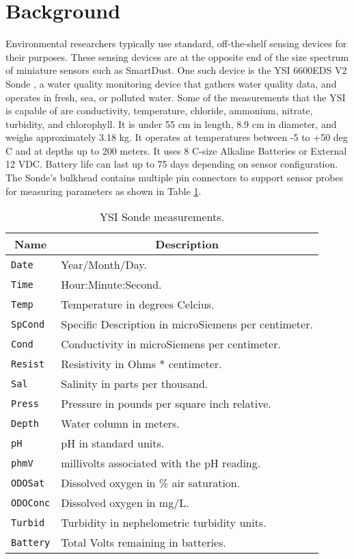 \documentclass[conference]{IEEEtran}
\begin{document}
\section{Background}
\label{SEC_BACKGROUND}

Environmental researchers typically use standard, off-the-shelf
sensing devices for their purposes. These sensing devices are at the
opposite end of the size spectrum of miniature sensors such as SmartDust. One such
device is the YSI 6600EDS V2 Sonde \cite{Sonde01}, a water
quality monitoring device that gathers water quality data, and
operates in fresh, sea, or polluted water. Some of the measurements
that the YSI is capable of are conductivity, temperature, chloride,
ammonium, nitrate, turbidity, and chlorophyll.  It is under 55 cm in
length, 8.9 cm in diameter, and weighs approximately 3.18 kg. It
operates at temperatures between -5 to +50 deg C and at depths up to
200 meters.  It uses 8 C-size Alkaline Batteries or External 12 VDC.
Battery life can last up to 75 days depending on sensor configuration.
The Sonde's bulkhead contains multiple pin connectors to support
sensor probes for measuring parameters as shown in Table
\ref{TAB_SONDE_MEASUREMENTS}.

\begin{table}[h]
\caption{\label{TAB_SONDE_MEASUREMENTS} YSI Sonde measurements.}
\centering
\begin{tabular}{|l||l|}
\hline
\multicolumn{1}{|c||}{\textbf{Name}} &
\multicolumn{1}{c|}{\textbf{Description}} \\ \hline \hline
\texttt{Date}    & Year/Month/Day. \\ \hline
\texttt{Time}    & Hour:Minute:Second. \\ \hline
\texttt{Temp}    & Temperature in degrees Celcius. \\ \hline
\texttt{SpCond}  & Specific Description in microSiemens
                   per centimeter. \\ \hline
\texttt{Cond}    & Conductivity in microSiemens per centimeter. \\ \hline
\texttt{Resist}  & Resistivity in Ohms $*$ centimeter. \\ \hline
\texttt{Sal}     & Salinity in parts per thousand. \\ \hline
\texttt{Press}   & Pressure in pounds per square inch relative. \\ \hline
\texttt{Depth}   & Water column in meters. \\ \hline
\texttt{pH}      & pH in standard units. \\ \hline
\texttt{phmV}    & millivolts associated with the pH reading. \\ \hline
\texttt{ODOSat}  & Dissolved oxygen in \% air saturation. \\ \hline
\texttt{ODOConc} & Dissolved oxygen in mg/L. \\ \hline
\texttt{Turbid}  & Turbidity in nephelometric turbidity units. \\ \hline
\texttt{Battery} & Total Volts remaining in batteries.  \\ \hline
\end{tabular}
\end{table}
\end{document}
